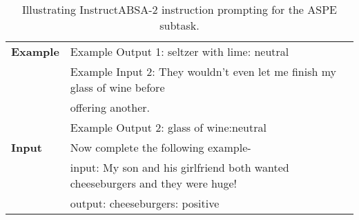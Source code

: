 \documentclass[11pt]{article}
\newcommand{\name}{\textsc{I}nstruct\textsc{ABSA}\xspace}
\begin{document}
\begin{table*}[]
\begin{tabular}{ll}
\textbf{Example}                 & Example Output 1: seltzer with lime: neutral                                  \\
\textbf{}                 & Example Input 2: They wouldn't even let me finish my glass of wine before     \\
                          & offering another.                                                  \\
\textbf{}                 & Example Output 2: glass of wine:neutral                                      \\ \hline
\textbf{Input}            & Now complete the following example-                                \\
\textbf{}                 & input: My son and his girlfriend both wanted cheeseburgers and they were huge!      \\
& output: cheeseburgers: positive                                                            \\ \hline
\end{tabular}
\caption{
     Illustrating \name{}-2 instruction prompting for the ASPE subtask.}
\label{tab:jt_ip}
\end{table*} 
\end{document}
